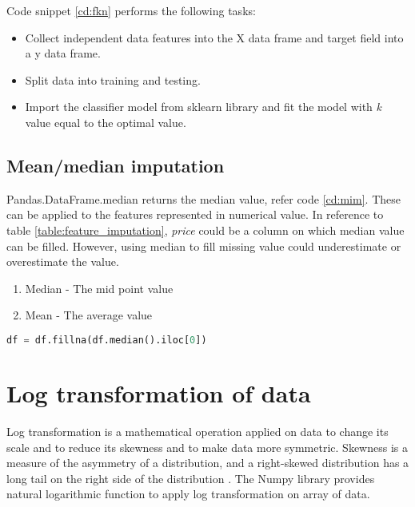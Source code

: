 Code snippet \ref{cd:fkn} performs the following tasks:

\begin{itemize}
    \item Collect independent data features into the X data frame and target field into a y data frame.
    \item  Split data into training and testing. 
    \item  Import the classifier model from sklearn library and fit the model with  \textit{k} value equal to the optimal value.
\end{itemize}




\subsection{Mean/median imputation}

Pandas.DataFrame.median \parencite{mckinney-proc-scipy-2010} returns the median value, refer code \ref{cd:mim}. These can be applied to the features represented in numerical value. In reference to table \ref{table:feature_imputation}, \textit{price} could be a column on which median value can be filled. However, using median to fill missing value could underestimate or overestimate the value.

\begin{enumerate}
    \item Median - The mid point value
    \item Mean - The average value
\end{enumerate}

\begin{lstlisting}[language=Python,caption={Mean imputation},label={cd:mim}]
    df = df.fillna(df.median().iloc[0])
\end{lstlisting}

\section{Log transformation of data}

Log transformation is a mathematical operation applied on data to change its scale and to reduce its skewness and to make data more symmetric.  Skewness is a measure of the asymmetry of a distribution, and a right-skewed distribution has a long tail on the right side of the distribution \parencite{BonnieMa}. The Numpy library provides natural logarithmic function to apply log transformation on array of data.


